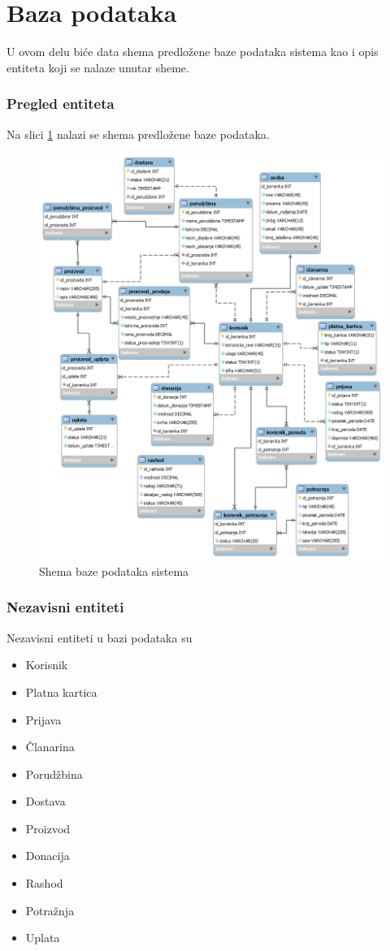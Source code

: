 \documentclass[a4paper]{article}
\begin{document}
\section{Baza podataka}
\label{baza_podataka}

U ovom delu biće data shema predložene baze podataka sistema kao i opis entiteta koji se nalaze unutar sheme.

\subsubsection{Pregled entiteta}
Na slici \ref{predlog_baze_sistema} nalazi se shema predložene baze podataka. 
\begin{figure}[h!]
    \centering
    \includegraphics[scale=0.42]{images/baza.png}
    \caption{Shema baze podataka sistema}
    \label{predlog_baze_sistema}
\end{figure}

\subsubsection{Nezavisni entiteti}
Nezavisni entiteti u bazi podataka su
\begin{itemize}
    \item Korisnik
    \item Platna kartica
    \item Prijava
    \item Članarina
    \item Porudžbina
    \item Dostava
    \item Proizvod
    \item Donacija
    \item Rashod
    \item Potražnja
    \item Uplata
\end{itemize}
\end{document}
